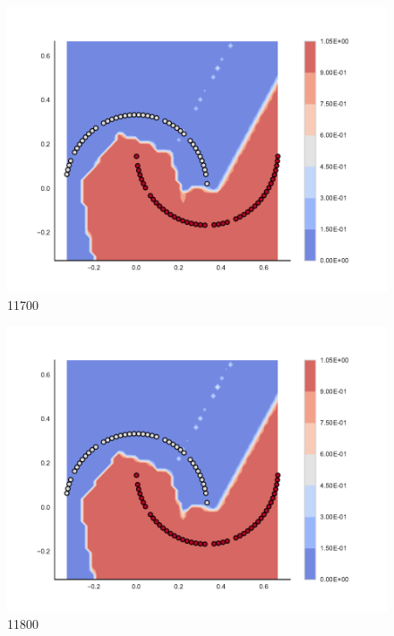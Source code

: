 \begin{subfigure}[b]{0.09\textwidth}
    \includegraphics[clip, trim=2.35cm 1.75cm 4.5cm 0cm,width=\textwidth]{img/convergence/11700.pdf}
    \caption{11700}
    \label{fig:convergence_11700}
\end{subfigure}
%
\begin{subfigure}[b]{0.09\textwidth}
    \includegraphics[clip, trim=2.35cm 1.75cm 4.5cm 0cm,width=\textwidth]{img/convergence/11800.pdf}
    \caption{11800}
    \label{fig:convergence_11800}
\end{subfigure}
%
